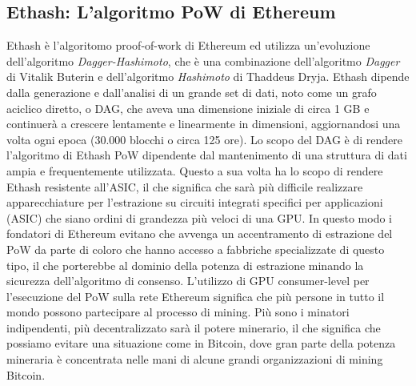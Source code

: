 \subsection*{Ethash: L'algoritmo PoW di Ethereum}
Ethash è l'algoritomo proof-of-work di Ethereum ed utilizza un'evoluzione dell'algoritmo \textit{Dagger-Hashimoto}, che è una combinazione dell'algoritmo \textit{Dagger} di Vitalik Buterin e dell'algoritmo \textit{Hashimoto} di Thaddeus Dryja. Ethash dipende dalla generazione e dall'analisi di un grande set di dati, noto come un grafo aciclico diretto, o DAG, che aveva una dimensione iniziale di circa 1 GB e continuerà a crescere lentamente e linearmente in dimensioni, aggiornandosi una volta ogni epoca (30.000 blocchi o circa 125 ore). Lo scopo del DAG è di rendere l'algoritmo di Ethash PoW dipendente dal mantenimento di una struttura di dati ampia e frequentemente utilizzata. Questo a sua volta ha lo scopo di rendere Ethash resistente all'ASIC, il che significa che sarà più difficile realizzare apparecchiature per l'estrazione su circuiti integrati specifici per applicazioni (ASIC) che siano ordini di grandezza più veloci di una GPU. In questo modo i fondatori di Ethereum evitano che avvenga un accentramento di estrazione del PoW da parte di coloro che hanno accesso a fabbriche specializzate di questo tipo, il che porterebbe al dominio della potenza di estrazione minando la sicurezza dell'algoritmo di consenso. L'utilizzo di GPU consumer-level per l'esecuzione del PoW sulla rete Ethereum significa che più persone in tutto il mondo possono partecipare al processo di mining. Più sono i minatori indipendenti, più decentralizzato sarà il potere minerario, il che significa che possiamo evitare una situazione come in Bitcoin, dove gran parte della potenza mineraria è concentrata nelle mani di alcune grandi organizzazioni di mining Bitcoin.